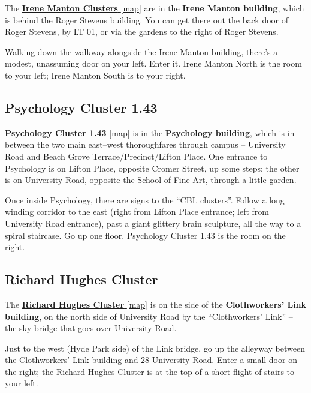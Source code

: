 \documentclass[
  a4paper,
]{book}
\theoremstyle{definition}
\theoremstyle{definition}
\theoremstyle{definition}
\theoremstyle{definition}
\theoremstyle{remark}
\begin{document}
The \href{manton.png}{\textbf{Irene Manton Clusters} {[}map{]}} are in the \textbf{Irene Manton building}, which is behind the Roger Stevens building. You can get there out the back door of Roger Stevens, by LT 01, or via the gardens to the right of Roger Stevens.

Walking down the walkway alongside the Irene Manton building, there's a modest, unassuming door on your left. Enter it. Irene Manton North is the room to your left; Irene Manton South is to your right.

\hypertarget{psychology}{%
\subsection*{Psychology Cluster 1.43}\label{psychology}}

\href{psychology.png}{\textbf{Psychology Cluster 1.43} {[}map{]}} is in the \textbf{Psychology building}, which is in between the two main east--west thoroughfares through campus -- University Road and Beach Grove Terrace/Precinct/Lifton Place. One entrance to Psychology is on Lifton Place, opposite Cromer Street, up some steps; the other is on University Road, opposite the School of Fine Art, through a little garden.

Once inside Psychology, there are signs to the ``CBL clusters''. Follow a long winding corridor to the east (right from Lifton Place entrance; left from University Road entrance), past a giant glittery brain sculpture, all the way to a spiral staircase. Go up one floor. Psychology Cluster 1.43 is the room on the right.

\hypertarget{hughes}{%
\subsection*{Richard Hughes Cluster}\label{hughes}}

The \href{richard-hughes.png}{\textbf{Richard Hughes Cluster} {[}map{]}} is on the side of the \textbf{Clothworkers' Link building}, on the north side of University Road by the ``Clothworkers' Link'' -- the sky-bridge that goes over University Road.

Just to the west (Hyde Park side) of the Link bridge, go up the alleyway between the Clothworkers' Link building and 28 University Road. Enter a small door on the right; the Richard Hughes Cluster is at the top of a short flight of stairs to your left.
\end{document}
